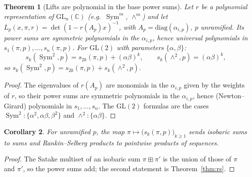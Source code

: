 \documentclass[11pt]{amsart}
\newtheorem{theorem}{Theorem}[section]
\newtheorem{corollary}[theorem]{Corollary}
\theoremstyle{definition}
\theoremstyle{remark}
\newcommand{\GL}{\mathrm{GL}}
\DeclareMathOperator{\Sym}{Sym}
\begin{document}
\begin{theorem}[Lifts are polynomial in the base power sums]\label{thm:lift}
Let $r$ be a polynomial representation of $\GL_n(\mathbb C)$ (e.g.\
$\Sym^m$, $\wedge^m$) and let $L_p(x,\pi,r)=\det(1-r(A_p)x)^{-1}$, with
$A_p=\mathrm{diag}(\alpha_{i,p})$, $p$ unramified. Its power sums are symmetric
polynomials in the $\alpha_{i,p}$, hence universal polynomials in
$s_1(\pi,p),\dots,s_n(\pi,p)$. For
$\GL(2)$ with parameters $\{\alpha,\beta\}$:
\[
s_k(\Sym^2,p)=s_{2k}(\pi,p)+(\alpha\beta)^k,\qquad
s_k(\wedge^2,p)=(\alpha\beta)^k,
\]
so $s_k(\Sym^2,p)=s_{2k}(\pi,p)+s_k(\wedge^2,p)$.
\end{theorem}
\begin{proof}
The eigenvalues of $r(A_p)$ are monomials in the $\alpha_{i,p}$ given by the
weights of $r$, so their power sums are symmetric polynomials in the
$\alpha_{i,p}$, hence (Newton--Girard) polynomials in $s_1,\dots,s_n$. The
$\GL(2)$ formulas are the cases $\Sym^2\colon\{\alpha^2,\alpha\beta,\beta^2\}$ and
$\wedge^2\colon\{\alpha\beta\}$.
\end{proof}

\begin{corollary}
For unramified $p$, the map $\pi\mapsto\bigl(s_k(\pi,p)\bigr)_{k\ge1}$ sends
isobaric sums to sums and Rankin--Selberg products to pointwise products of
sequences.
\end{corollary}
\begin{proof}
The Satake multiset of an isobaric sum $\pi\boxplus\pi'$ is the union of those of
$\pi$ and $\pi'$, so the power sums add; the second statement is
Theorem~\ref{thm:rs}.
\end{proof}
\end{document}
